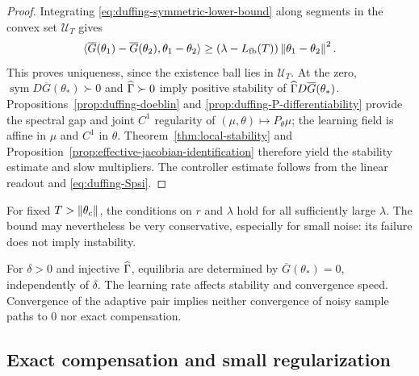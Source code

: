 \begin{proof}
Integrating \eqref{eq:duffing-symmetric-lower-bound} along segments in
the convex set $\mathcal U_T$ gives
\begin{equation}
  \langle\overline G(\theta_1)-\overline G(\theta_2),\theta_1-\theta_2\rangle
  \ge(\lambda-L_{\rm fb}(T))\left\lVert \theta_1-\theta_2\right\rVert^2.
  \label{eq:duffing-strong-monotonicity}
\end{equation}
This proves uniqueness, since the existence ball lies in $\mathcal U_T$.
At the zero, $\operatorname{sym}D\overline G(\theta_*)\succ0$ and
$\widehat{\Gamma}\succ0$ imply positive stability of
$\widehat{\Gamma} D\overline G(\theta_*)$.
Propositions~\ref{prop:duffing-doeblin} and
\ref{prop:duffing-P-differentiability} provide the spectral gap and joint
$C^1$ regularity of $(\mu,\theta)\mapsto P_\theta\mu$; the learning field
is affine in $\mu$ and $C^1$ in $\theta$. Theorem~\ref{thm:local-stability}
and Proposition~\ref{prop:effective-jacobian-identification} therefore yield
the stability estimate and slow multipliers. The controller estimate follows
from the linear readout and \eqref{eq:duffing-Spsi}.
\end{proof}

For fixed $T>\left\lVert \theta_c\right\rVert$, the conditions on $r$ and $\lambda$ hold
for all sufficiently large $\lambda$. The bound may nevertheless be very
conservative, especially for small noise: its failure does not imply instability.

\begin{remark}
\label{rem:duffing-learning-rate}
For $\delta>0$ and injective $\widehat{\Gamma}$, equilibria are determined by
$\overline G(\theta_*)=0$, independently of $\delta$. The learning rate
affects stability and convergence speed. Convergence of the adaptive pair
implies neither convergence of noisy sample paths to $0$ nor exact compensation.
\end{remark}

\subsection{Exact compensation and small regularization}

